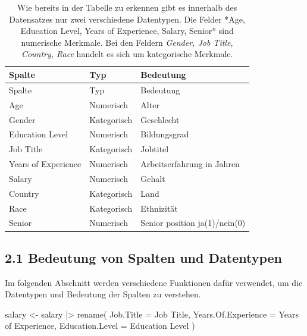 \documentclass[
  letterpaper,
  DIV=11,
  numbers=noendperiod]{scrartcl}
\newenvironment{Shaded}{\begin{snugshade}}{\end{snugshade}}
\newcommand{\AttributeTok}[1]{\textcolor[rgb]{0.40,0.45,0.13}{#1}}
\newcommand{\FunctionTok}[1]{\textcolor[rgb]{0.28,0.35,0.67}{#1}}
\newcommand{\NormalTok}[1]{\textcolor[rgb]{0.00,0.23,0.31}{#1}}
\newcommand{\OtherTok}[1]{\textcolor[rgb]{0.00,0.23,0.31}{#1}}
\newcommand{\SpecialCharTok}[1]{\textcolor[rgb]{0.37,0.37,0.37}{#1}}
\newcommand{\StringTok}[1]{\textcolor[rgb]{0.13,0.47,0.30}{#1}}
\begin{document}
\begin{longtable}[]{@{}lll@{}}
\caption{Wie bereits in der Tabelle zu erkennen gibt es innerhalb des
Datensatzes nur zwei verschiedene Datentypen. Die Felder *Age, Education
Level, Years of Experience, Salary, Senior* sind numerische Merkmale.
Bei den Feldern \emph{Gender, Job Title, Country, Race} handelt es sich
um kategorische Merkmale.}\tabularnewline
\toprule\noalign{}
Spalte & Typ & Bedeutung \\
\midrule\noalign{}
\endfirsthead
\toprule\noalign{}
Spalte & Typ & Bedeutung \\
\midrule\noalign{}
\endhead
\bottomrule\noalign{}
\endlastfoot
Age & Numerisch & Alter \\
Gender & Kategorisch & Geschlecht \\
Education Level & Numerisch & Bildungsgrad \\
Job Title & Kategorisch & Jobtitel \\
Years of Experience & Numerisch & Arbeitserfahrung in Jahren \\
Salary & Numerisch & Gehalt \\
Country & Kategorisch & Land \\
Race & Kategorisch & Ethnizität \\
Senior & Numerisch & Senior position ja(1)/nein(0) \\
\end{longtable}

\hypertarget{bedeutung-von-spalten-und-datentypen}{%
\subsection{2.1 Bedeutung von Spalten und
Datentypen}\label{bedeutung-von-spalten-und-datentypen}}

Im folgenden Abschnitt werden verschiedene Funktionen dafür verwendet,
um die Datentypen und Bedeutung der Spalten zu verstehen.

\begin{Shaded}
\begin{Highlighting}[]
\NormalTok{salary }\OtherTok{\textless{}{-}}\NormalTok{ salary }\SpecialCharTok{|\textgreater{}}
    \FunctionTok{rename}\NormalTok{(}
      \AttributeTok{Job.Title =} \StringTok{\textasciigrave{}}\AttributeTok{Job Title}\StringTok{\textasciigrave{}}\NormalTok{,}
      \AttributeTok{Years.Of.Experience =} \StringTok{\textasciigrave{}}\AttributeTok{Years of Experience}\StringTok{\textasciigrave{}}\NormalTok{,}
      \AttributeTok{Education.Level =} \StringTok{\textasciigrave{}}\AttributeTok{Education Level}\StringTok{\textasciigrave{}}
\NormalTok{    )}
\end{Highlighting}
\end{Shaded}
\end{document}
